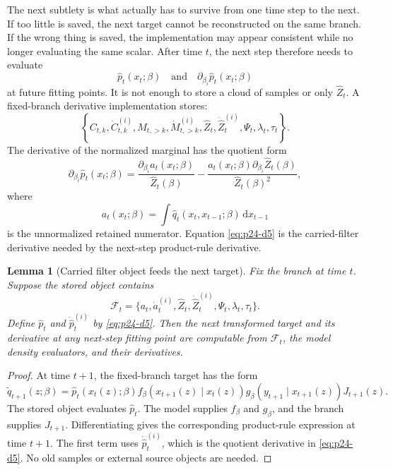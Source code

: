 \documentclass[11pt]{article}
\newtheorem{lemma}{Lemma}
\numberwithin{equation}{section}
\newcommand{\dd}{\,\mathrm d}
\begin{document}
The next subtlety is what actually has to survive from one time step to the next.
If too little is saved, the next target cannot be reconstructed on the same branch.
If the wrong thing is saved, the implementation may appear consistent while no
longer evaluating the same scalar.  After time \(t\), the next step therefore needs to evaluate
\[
    \widehat p_t(x_t;\beta)
    \quad\text{and}\quad
    \partial_{\beta_i}\widehat p_t(x_t;\beta)
\]
at future fitting points.  It is not enough to store a cloud of samples or only
\(\widehat Z_t\).  A fixed-branch derivative implementation stores:
\begin{equation}
    \left\{
    C_{t,k},\dot C_{t,k}^{(i)},M_{t,>k},\dot M_{t,>k}^{(i)},
    \widehat Z_t,\dot{\widehat Z}_t^{(i)},
    \Psi_t,\lambda_t,\tau_t
    \right\}.
    \label{eq:p24-d4}
\end{equation}
The derivative of the normalized marginal has the quotient form
\begin{equation}
    \partial_{\beta_i}\widehat p_t(x_t;\beta)
    =
    \frac{\partial_{\beta_i}a_t(x_t;\beta)}{\widehat Z_t(\beta)}
    -
    \frac{a_t(x_t;\beta)\partial_{\beta_i}\widehat Z_t(\beta)}
    {\widehat Z_t(\beta)^2},
    \label{eq:p24-d5}
\end{equation}
where
\begin{equation}
    a_t(x_t;\beta)
    =
    \int \widehat q_t(x_t,x_{t-1};\beta)\dd x_{t-1}
    \label{eq:p24-d6}
\end{equation}
is the unnormalized retained numerator.  Equation \eqref{eq:p24-d5} is the carried-filter
derivative needed by the next-step product-rule derivative.

\begin{lemma}[Carried filter object feeds the next target]
Fix the branch at time \(t\).  Suppose the stored object contains
\[
    \mathcal F_t
    =
    \{a_t,\dot a_t^{(i)},\widehat Z_t,\dot{\widehat Z}_t^{(i)},
      \Psi_t,\lambda_t,\tau_t\}.
\]
Define \(\widehat p_t\) and \(\dot{\widehat p}_t^{(i)}\) by \eqref{eq:p24-d5}.  Then the
next transformed target and its derivative at any next-step fitting point are
computable from \(\mathcal F_t\), the model density evaluators, and their
derivatives.
\end{lemma}

\begin{proof}
At time \(t+1\), the fixed-branch target has the form
\[
    \widetilde q_{t+1}(z;\beta)
    =
    \widehat p_t(x_t(z);\beta)
    f_\beta(x_{t+1}(z)\mid x_t(z))
    g_\beta(y_{t+1}\mid x_{t+1}(z))
    J_{t+1}(z).
\]
The stored object evaluates \(\widehat p_t\).  The model supplies \(f_\beta\)
and \(g_\beta\), and the branch supplies \(J_{t+1}\).  Differentiating gives
the corresponding product-rule expression at time \(t+1\).  The first
term uses \(\dot{\widehat p}_t^{(i)}\), which is the quotient derivative in
\eqref{eq:p24-d5}.  No old samples or external source objects are needed.
\end{proof}
\end{document}
